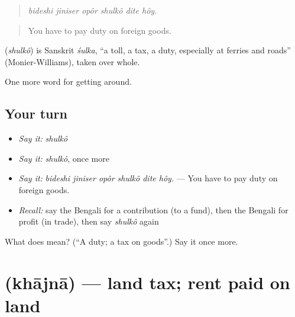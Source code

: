 \begin{quote}
     
\end{quote}

\begin{quote}
\emph{bideshi jiniser opôr shulkô dite hôy.}
\end{quote}

\begin{quote}
You have to pay duty on foreign goods.
\end{quote}

\begin{cousinweb}
\textbf{} (\emph{shulkô}) is Sanskrit \emph{śulka}, \textquotedblleft{}a toll, a tax, a duty, especially at ferries and roads\textquotedblright{} (Monier-Williams), taken over whole.
\end{cousinweb}

\begin{grammarlens}[title={What you've built}]
One more word for getting around.
\end{grammarlens}

\subsection*{Your turn}
\begin{itemize}
\raggedright
  \item \emph{Say it:} \emph{shulkô}
  \item \emph{Say it:} \emph{shulkô}, once more
  \item \emph{Say it:} \emph{bideshi jiniser opôr shulkô dite hôy.} — You have to pay duty on foreign goods.
  \item \emph{Recall:} say the Bengali for a contribution (to a fund), then the Bengali for profit (in trade), then say \emph{shulkô} again
\end{itemize}

\begin{tcolorbox}[breakable,colback=teal!4,colframe=teal!35!black,title={Before you move on}]
What does  mean? (\textquotedblleft{}A duty; a tax on goods\textquotedblright{}.) Say it once more.
\end{tcolorbox}
\section[\texorpdfstring{\bn{খাজনা} (khājnā)}{খাজনা (khājnā)}]{ (khājnā) — land tax; rent paid on land}

